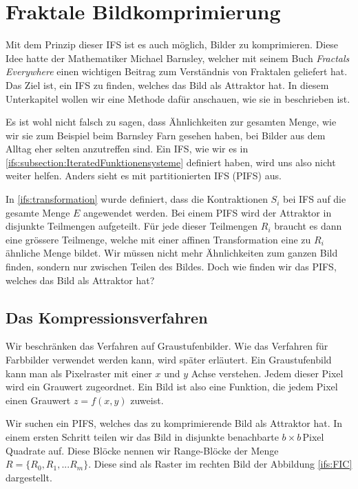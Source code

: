 %
%
%
\section{Fraktale Bildkomprimierung
\label{ifs:section:teil3}}
%
Mit dem Prinzip dieser IFS ist es auch möglich, Bilder zu komprimieren.
Diese Idee hatte der Mathematiker Michael Barnsley, welcher mit seinem Buch {\em Fractals Everywhere} einen wichtigen Beitrag zum Verständnis von Fraktalen geliefert hat.
Das Ziel ist, ein IFS zu finden, welches das Bild als Attraktor hat.
In diesem Unterkapitel wollen wir eine Methode dafür anschauen, wie sie in \cite{ifs:Rousseau2012} beschrieben ist.

Es ist wohl nicht falsch zu sagen, dass Ähnlichkeiten zur gesamten Menge, wie wir sie zum Beispiel beim Barnsley Farn gesehen haben, bei Bilder aus dem Alltag eher selten anzutreffen sind.
Ein IFS, wie wir es in \ref{ifs:subsection:IteratedFunktionensysteme} definiert haben, wird uns also nicht weiter helfen.
Anders sieht es mit partitionierten IFS (PIFS) \cite{ifs:pifs} aus.

In \ref{ifs:transformation} wurde definiert, dass die Kontraktionen $S_i$ bei IFS auf die gesamte Menge $E$ angewendet werden.
Bei einem PIFS wird der Attraktor in disjunkte Teilmengen aufgeteilt. 
Für jede dieser Teilmengen $R_i$ braucht es dann eine grössere Teilmenge, welche mit einer affinen Transformation eine zu $R_i$ ähnliche Menge bildet.
Wir müssen nicht mehr Ähnlichkeiten zum ganzen Bild finden, sondern nur zwischen Teilen des Bildes.
Doch wie finden wir das PIFS, welches das Bild als Attraktor hat?

\subsection{Das Kompressionsverfahren
\label{ifs:subsection:malorum}}
%
Wir beschränken das Verfahren auf Graustufenbilder. Wie das Verfahren für Farbbilder verwendet werden kann, wird später erläutert.
%
Ein Graustufenbild kann man als Pixelraster mit einer $x$ und $y$ Achse verstehen.
Jedem dieser Pixel wird ein Grauwert zugeordnet.
Ein Bild ist also eine Funktion, die jedem Pixel einen Grauwert \(z = f(x,y)\) zuweist.

Wir suchen ein PIFS, welches das zu komprimierende Bild als Attraktor hat.
In einem ersten Schritt teilen wir das Bild in disjunkte benachbarte $b \times b$\,Pixel Quadrate auf. Diese Blöcke nennen wir Range-Blöcke der Menge $R=\{R_0,R_1,...R_m\}$. Diese sind als Raster im rechten Bild der Abbildung \ref{ifs:FIC} dargestellt.
%
%

